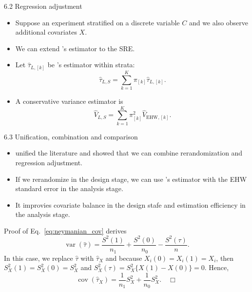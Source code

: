 \documentclass[aspectratio=169, 12pt]{beamer}
\begin{document}
\begin{frame}{6.2 Regression adjustment}
  \begin{itemize}
    \item Suppose an experiment stratified on a discrete variable $C$ and we also observe additional covariates $X$.
    \item We can extend \citet{lin2013agnostic}'s estimator to the SRE.
    \item Let $\widehat{\tau}_{L,[k]}$ be \citet{lin2013agnostic}'s estimator within strata:
    \[
    \widehat{\tau}_{L,S}=\sum_{k=1}^{K}\pi_{[k]}\widehat{\tau}_{L,[k]}.
    \]
    \item A conservative variance estimator is
    \[
    \widehat{V}_{L,S}=\sum_{k=1}^{K}\pi_{[k]}^2\widehat{V}_{\text{EHW},[k]}.
    \]
  \end{itemize}
\end{frame}

\begin{frame}{6.3 Unification, combination and comparison}
  \begin{itemize}
    \item \citet{li2020rerandomization} unified the literature and showed that we can combine rerandomization and regression adjustment.
    \item If we rerandomize in the design stage, we can use \citet{lin2013agnostic}'s estimator with the EHW standard error in the analysis stage.
    \item It improvies covariate balance in the design stafe and estimation efficiency in the analysis stage.
  \end{itemize}
\end{frame}




\begin{frame}[label=pr-neymanian_cov]{Proof of Eq.~\eqref{eq:neymanian_cov}}
  \citet{neyman1923application} derives 
  $$\operatorname{var}(\widehat{\tau})=\frac{S^2(1)}{n_1}+\frac{S^2(0)}{n_0}-\frac{S^2(\tau)}{n}.$$
  In this case, we replace $\widehat{\tau}$ with $\widehat{\tau}_X$ and because $X_i(0)=X_i(1)=X_i$, then $S_X^2(1)=S_X^2(0)=S_X^2$ and $S_X^2(\tau)=S_X^2\{X(1)-X(0)\}=0$. Hence,
  \[
  \operatorname{cov}(\widehat{\tau}_X) = \frac{1}{n_1}S_X^2 + \frac{1}{n_0}S_X^2. \quad \Box
  \]
  \vfill
  \hfill\hyperlink{neymanian_cov<1>}{}
\end{frame}
\end{document}
